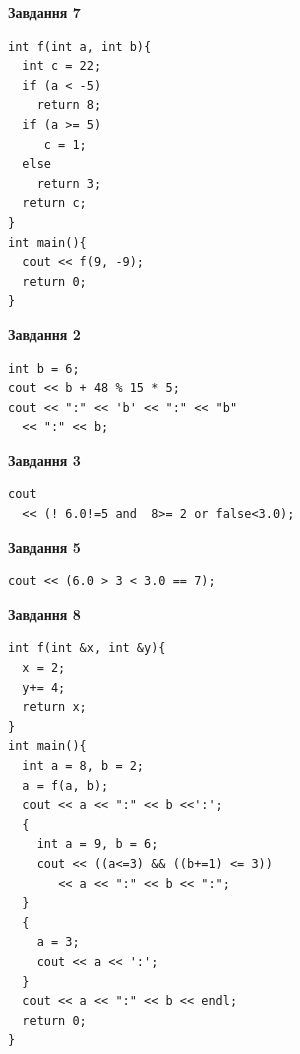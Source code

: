 \documentclass[12pt, ukrainian]{article}
\begin{document}
{\begin {large}
\begin{minipage}[t]{7.0cm}
\begin{center}
\textbf{Завдання 7}
\end{center}
\vspace{-8mm}

\begin{verbatim}
int f(int a, int b){
  int c = 22;
  if (a < -5)
    return 8;
  if (a >= 5)
     c = 1;
  else
    return 3;
  return c;
}
int main(){
  cout << f(9, -9);
  return 0;
}
\end{verbatim}

\end{minipage}
\vline \hspace{1mm}
\begin{minipage}[t]{11.0cm}

\begin{center}
\textbf{Завдання 2}
\end{center}
\vspace{-8mm}

\begin{verbatim}
int b = 6;
cout << b + 48 % 15 * 5;
cout << ":" << 'b' << ":" << "b" 
  << ":" << b;
\end{verbatim}



\begin{center}
\textbf{Завдання 3}
\end{center}
\vspace{-8mm}

\begin{verbatim}
cout 
  << (! 6.0!=5 and  8>= 2 or false<3.0);
\end{verbatim}



\begin{center}
\textbf{Завдання 5}
\end{center}
\vspace{-8mm}

\begin{verbatim}
cout << (6.0 > 3 < 3.0 == 7);
\end{verbatim}



\begin{center}
\textbf{Завдання 8}
\end{center}
\vspace{-8mm}

\begin{verbatim}
int f(int &x, int &y){
  x = 2;
  y+= 4;
  return x;
}
int main(){
  int a = 8, b = 2;
  a = f(a, b);
  cout << a << ":" << b <<':';
  {
    int a = 9, b = 6;
    cout << ((a<=3) && ((b+=1) <= 3))
       << a << ":" << b << ":";
  }
  {
    a = 3;
    cout << a << ':';
  }
  cout << a << ":" << b << endl;
  return 0;
}
\end{verbatim}


\end{minipage}
\end{large}}
\end{document}
